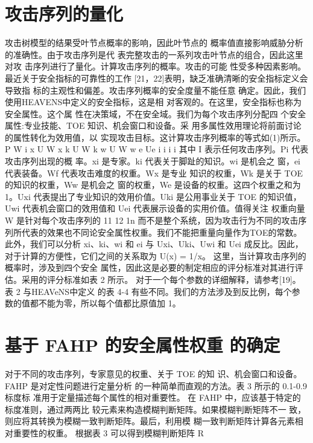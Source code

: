 \section{攻击序列的量化}
攻击树模型的结果受叶节点概率的影响，因此叶节点的
概率值直接影响威胁分析的准确性。由于攻击序列是代
表完整攻击的一系列攻击叶节点的组合，因此这里对攻
击序列进行了量化。计算攻击序列的概率。攻击的可能
性受多种因素影响。最近关于安全指标的可靠性的工作
[21，22]表明，缺乏准确清晰的安全指标定义会导致指
标的主观性和偏差。攻击序列概率的安全度量不能任意
确定。因此，我们使用HEAVENS中定义的安全指标，这是相
对客观的。在这里，安全指标也称为安全属性。这个属
性在决策域，不在安全域。我们为每个攻击序列分配四
个安全属性:专业技能、TOE 知识、机会窗口和设备。采
用多属性效用理论将前面讨论的属性转化为效用值，以
实现攻击目标。这计算攻击序列概率的等式如(1)所示。
\newline
P W i x U W x k U W k w U W w e Ue i i i i 
\newline
其中 I 表示任何攻击序列。Pi 代表攻击序列出现的概
率。xi 是专家。ki 代表关于脚趾的知识。wi 是机会之
窗，ei 代表装备。Wf 代表攻击难度的权重。Wx 是专业
知识的权重，Wk 是关于 TOE 的知识的权重，Ww 是机会之
窗的权重，We 是设备的权重。这四个权重之和为
1。Uxi 代表提出了专业知识的效用价值。Uki 是公用事业关于 TOE 的知识值，Uwi 代表机会窗口的效用值和 Uei 代表展示设备的实用价值。值得关注 权重向量 W 是针对每个攻击序列的 11 12 1n
而不是整个系统，因为攻击行为不同的攻击序列所代表的效果也不同论安全属性权重。我们不能把重量向量作为TOE的常数。
此外，我们可以分析 xi、ki、wi 和
ei 与 Uxi、Uki、Uwi 和 Uei 成反比。因此，对于计算的方便性，它们之间的关系取为 U(x) = 1/x。
这里，当计算攻击序列的概率时，涉及到四个安全
属性，因此这是必要的制定相应的评分标准对其进行评估。采用的评分标准如表 2 所示。
\newline
对于一个每个参数的详细解释，请参考[19]。
表 2 与HEAVeNS中定义
的表 4-4 有些不同。我们的方法涉及到反比例，每个参
数的值都不能为零，所以每个值都比原值加 1。
\section{ 基于 FAHP 的安全属性权重
的确定}
对于不同的攻击序列，专家意见的权重、关于 TOE 的知
识、机会窗口和设备。FAHP 是对定性问题进行定量分析
的一种简单而直观的方法。表 3 所示的 0.1-0.9 标度标
准用于定量描述每个属性的相对重要性。
在 FAHP 中，应该基于特定的标度准则，通过两两比
较元素来构造模糊判断矩阵。如果模糊判断矩阵不一
致，则应将其转换为模糊一致判断矩阵。最后，利用模
糊一致判断矩阵计算各元素相对重要性的权重。
根据表 3 可以得到模糊判断矩阵 R

